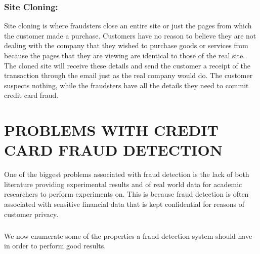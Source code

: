 \documentclass{report}
\begin{document}
\subsection{Site Cloning:}
Site cloning is where fraudsters close an entire site or just the pages from which the customer made a purchase. Customers have no reason to believe they are not dealing with the company that they wished to purchase goods or services from because the pages that they are viewing are identical to those of the real site. The cloned site will receive these details and send the customer a receipt of the transaction through the email just as the real company would do. The customer suspects nothing, while the fraudsters have all the details they need to commit credit card fraud.

\chapter{PROBLEMS WITH CREDIT CARD FRAUD DETECTION}

One of the biggest problems associated with fraud detection is the lack of both literature providing experimental results and of real world data for academic researchers to perform experiments on. This is because fraud detection is often associated with sensitive financial data that is kept confidential for reasons of customer privacy. 
\paragraph{}
We now enumerate some of the properties a fraud detection system should have in order to perform good results. 
\end{document}
